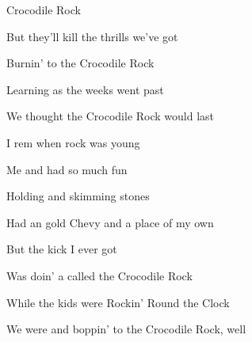 \begin{SBSong}{Crocodile Rock}
\begin{SBVerse}
    But they'll  kill the thrills we've got
    
    Burnin'  to the Crocodile Rock
    
    Learning  as the weeks went past
    
    We  thought the Crocodile Rock would last
  \end{SBVerse}
  \CBPageBrk
  \begin{SBVerse}
    I rem when rock was young
    
    Me and  had so much fun
    
    Holding  and skimming stones
    
    Had an  gold Chevy and a place of my own
    
    But the  kick I ever got
    
    Was doin' a  called the Crocodile Rock
    
    While the  kids were Rockin' Round the Clock
    
    We were  and boppin' to the Crocodile Rock, well
  \end{SBVerse}
\end{SBSong}